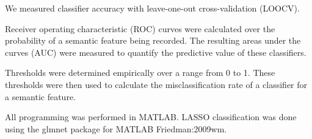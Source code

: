 We measured classifier accuracy with leave-one-out cross-validation (LOOCV). 

Receiver operating characteristic (ROC) curves were calculated over the probability of a semantic feature being recorded. The resulting areas under the curves (AUC) were measured to quantify the predictive value of these classifiers.

Thresholds were determined empirically over a range from 0 to 1. These thresholds were then used to calculate the misclassification rate of a classifier for a semantic feature.

All programming was performed in MATLAB. LASSO classification was done using the glmnet package for MATLAB {Friedman:2009wm}.